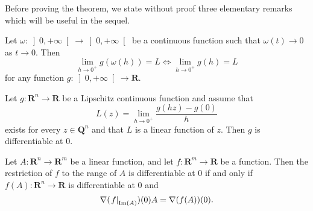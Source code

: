 \documentclass[mlq,fleqn]{w-art}
\DeclareMathOperator{\IM}{Im}
\newcommand{\eval}[2][\right]{\relax
  \ifx#1\right\relax \left.\fi#2#1\rvert}
\begin{document}
Before proving the theorem, we state without proof three elementary
remarks which will be useful in the sequel.
\begin{rem}\label{r:omb}
Let $\omega\colon \left]0,+\infty\right[\to \left]0,+\infty\right[$
be a continuous function such that $\omega (t)\to 0$ as $t\to
0$. Then
\[\lim_{h\to 0^+}g(\omega(h))=L\Leftrightarrow\lim_{h\to
0^+}g(h)=L\]
for any function $g\colon \left]0,+\infty\right[\to \mathbf{R}$.
\end{rem}
\begin{rem}\label{r:dif}
Let $g \colon  \mathbf{R}^n\to \mathbf{R}$ be a Lipschitz
continuous function and assume that
\[L(z)=\lim_{h\to 0^+}\frac{g(hz)-g(0)}h\]
exists for every $z\in\mathbf{Q}^n$ and that $L$ is a linear function of
$z$. Then $g$ is differentiable at 0.
\end{rem}
\begin{rem}\label{r:dif0}
Let $A \colon \mathbf{R}^n\to \mathbf{R}^m$ be a linear function, and
let $f \colon \mathbf{R}^m\to \mathbf{R}$ be a function. Then the
restriction of $f$ to the range of $A$ is differentiable at 0 if and
only if $f(A)\colon \mathbf{R}^n\to \mathbf{R}$ is differentiable at 0
and
\[\nabla(\eval{f}_{\IM(A)})(0)A=\nabla (f(A))(0).\]
\end{rem}
\end{document}
